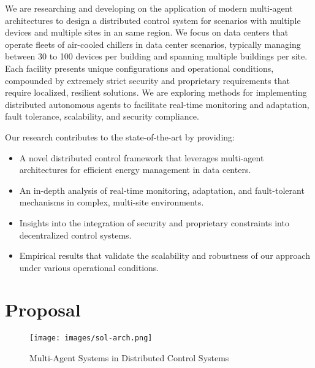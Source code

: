 \documentclass{svproc}
\begin{document}

We are researching and developing on the application of modern multi-agent architectures to design a distributed control system for scenarios with multiple devices and multiple sites in an same region. We focus on data centers that operate fleets of air-cooled chillers in data center scenarios, typically managing between 30 to 100 devices per building and spanning multiple buildings per site. Each facility presents unique configurations and operational conditions, compounded by extremely strict security and proprietary requirements that require localized, resilient solutions. We are exploring methods for implementing distributed autonomous agents to facilitate real-time monitoring and adaptation, fault tolerance, scalability, and security compliance. 

Our research contributes to the state-of-the-art by providing:

\begin{itemize} 

\item A novel distributed control framework that leverages multi-agent architectures for efficient energy management in data centers. 

\item An in-depth analysis of real-time monitoring, adaptation, and fault-tolerant mechanisms in complex, multi-site environments. 

\item Insights into the integration of security and proprietary constraints into decentralized control systems. 

\item Empirical results that validate the scalability and robustness of our approach under various operational conditions.

\end{itemize}




\section{Proposal}
\label{sec:proposal}

\begin{figure}[h!]
    \centering
    \texttt{[image: images/sol-arch.png]}
    \caption{Multi-Agent Systems in Distributed Control Systems}
    \label{fig:sol-arch}
\end{figure}
\end{document}
